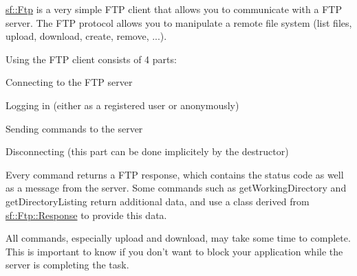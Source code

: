 \hyperlink{classsf_1_1_ftp}{sf\+::\+Ftp} is a very simple F\+T\+P client that allows you to communicate with a F\+T\+P server. The F\+T\+P protocol allows you to manipulate a remote file system (list files, upload, download, create, remove, ...).

Using the F\+T\+P client consists of 4 parts\+: \begin{DoxyItemize}
\item Connecting to the F\+T\+P server \item Logging in (either as a registered user or anonymously) \item Sending commands to the server \item Disconnecting (this part can be done implicitely by the destructor)\end{DoxyItemize}
Every command returns a F\+T\+P response, which contains the status code as well as a message from the server. Some commands such as get\+Working\+Directory and get\+Directory\+Listing return additional data, and use a class derived from \hyperlink{classsf_1_1_ftp_1_1_response}{sf\+::\+Ftp\+::\+Response} to provide this data.

All commands, especially upload and download, may take some time to complete. This is important to know if you don't want to block your application while the server is completing the task.

